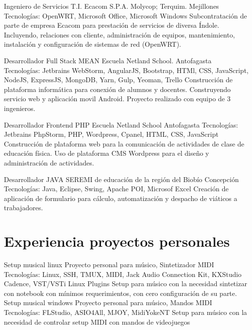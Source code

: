 \documentclass[draft,color,12pt,letterpaper,sans]{moderncv}
\begin{document}
{Ingeniero de Servicios T.I.}
{Ecacom S.P.A.}
{Molycop; Terquim. Mejillones}
{\newline Tecnolog\'ias: OpenWRT, Microsoft Office, Microsoft Windows}
{Subcontrataci\'on de parte de empresa Ecacom para prestaci\'on de servicios de diversa \'Indole. Incluyendo, relaciones con cliente, administraci\'on de equipos, mantenimiento, instalaci\'on y configuraci\'on de sistemas de red (OpenWRT).\newline}

{Desarrollador Full Stack MEAN}
{Escuela Netland School.}
{Antofagasta}
{\newline Tecnolog\'ias: Jetbrains WebStorm, AngularJS, Bootstrap, HTMl, CSS, JavaScript, NodeJS, ExpressJS, MongoDB, Yarn, Gulp, Yeoman, Trello}
{Construcci\'on de plataforma inform\'atica para conexi\'on de alumnos y docentes. Construyendo servicio web y aplicaci\'on movil Android. Proyecto realizado con equipo de 3 ingenieros. \newline}

{Desarrollador Frontend PHP}
{Escuela Netland School}
{Antofagasta}
{\newline Tecnolog\'ias: Jetbrains PhpStorm, PHP, Wordpress, Cpanel, HTML, CSS, JavaScript}
{Construcci\'on de plataforma web para la comunicaci\'on de actividades de clase de educaci\'on f\'isica. Uso de plataforma CMS Wordpress para el dise\~no y administraci\'on de actividades.\newline}

{Desarrollador JAVA}
{SEREMI de educación de la región del Biobío}
{Concepci\'on}
{\newline Tecnolog\'ias: Java, Eclipse, Swing, Apache POI, Microsof Excel}
{Creaci\'on de aplicaci\'on de formulario para c\'alculo, automatizaci\'on y despacho de vi\'aticos a trabajadores.\newline}


\section{Experiencia proyectos personales}

\cventry {}
{Setup musical linux}
{Proyecto personal para m\'usico, Sintetizador MIDI}
{}
{\newline Tecnolog\'ias: Linux, SSH, TMUX, MIDI, Jack Audio Connection Kit, KXStudio Cadence, VST/VSTi Linux Plugins}
{Setup para m\'usico con la necesidad sintetizar con notebook con m\'inimos requerimientos, con cero configuraci\'on de su parte.\newline}
\cventry {}
{Setup musical windows}
{Proyecto personal para m\'usico, Mandos MIDI}
{}
{\newline Tecnolog\'ias: FLStudio, ASIO4All, MJOY, MidiYokeNT}
{Setup para m\'usico con la necesidad de controlar setup MIDI con mandos de videojuegos\newline}
\end{document}
